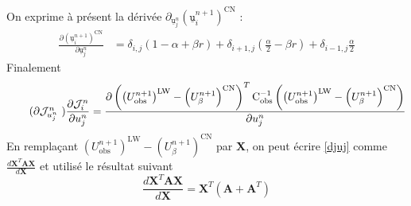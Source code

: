 \documentclass[a4paper,12pt]{article}
\newcommand{\bepar}[1]{
	\left( #1 \right)  
}
\newcommand{\uin}[2]{
	\underline{\texttt{u}}_{#1}^{#2}
}
\newcommand{\ui}[1]{
	\underline{\texttt{u}}_{#1}^{n}
}
\newcommand{\dij}[1]{
	\delta_{#1,j}
}
\numberwithin{equation}{section} %
\begin{document}
 \noindent On exprime à présent la dérivée $\partial_{\ui{j}} \bepar{\uin{i}{n+1}}^\text{CN}$ :
 \begin{align*}
 \frac{\partial \bepar{\uin{i}{n+1}}^\text{CN}}{\partial \ui{j} } & = \dij{i}\bepar{1 - \alpha +  \beta r} + \dij{i+1}\bepar{\frac{\alpha}{2} - \beta r} + \dij{i-1}\frac{\alpha}{2}
 \end{align*}
Finalement  
 \begin{equation} \tag{$\partial \mathcal{J}^n_{u_j^n}$ }
 \frac{\partial \mathcal{J}^n_i}{\partial u_j^n} = \frac{\partial \bepar{\bepar{U^{n+1}_{\text{obs}}}^\text{LW} - \bepar{U^{n+1}_\beta}^\text{CN}}^T \text{C}_\text{obs}^{-1} \bepar{\bepar{U^{n+1}_{\text{obs}}}^\text{LW} - \bepar{U^{n+1}_\beta}^\text{CN}}}{\partial u_j^n} \label{djuj}
 \end{equation}
 En remplaçant $\bepar{U^{n+1}_{\text{obs}}}^\text{LW} - \bepar{U^{n+1}_\beta}^\text{CN}$ par \textbf{X}, on peut écrire \ref{djuj} comme $\displaystyle \frac{d\textbf{X}^T\textbf{A}\textbf{X}}{d\textbf{X}}$ et utilisé le résultat suivant
 \begin{equation*}
 \frac{d\textbf{X}^T\textbf{A}\textbf{X}}{d\textbf{X}} = \textbf{X}^T\bepar{\textbf{A} + \textbf{A}^T}
 \end{equation*}
\end{document}

